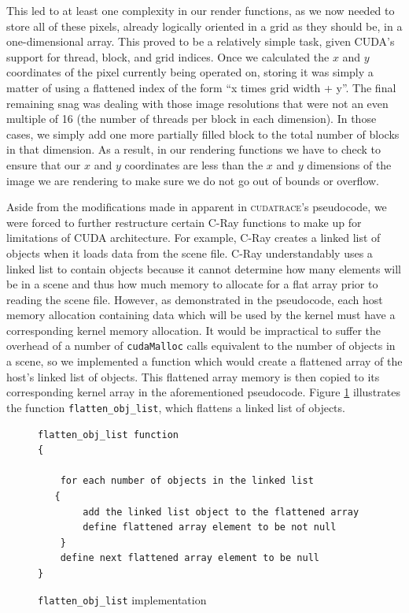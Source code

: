 \documentclass[12pt]{article}
\begin{document}
This led to at least one complexity in our render functions, as we now needed to store all of these pixels, already logically oriented in a grid as they should be, in a one-dimensional array. This proved to be a relatively simple task, given CUDA’s support for thread, block, and grid indices. Once we calculated the $x$ and $y$ coordinates of the pixel currently being operated on, storing it was simply a matter of using a flattened index of the form “x times grid width + y”. The final remaining snag was dealing with those image resolutions that were not an even multiple of 16 (the number of threads per block in each dimension). In those cases, we simply add one more partially filled block to the total number of blocks in that dimension. As a result, in our rendering functions we have to check to ensure that our $x$ and $y$ coordinates are less than the $x$ and $y$ dimensions of the image we are rendering to make sure we do not go out of bounds or overflow. 

Aside from the modifications made in apparent in \textsc{cudatrace}’s pseudocode, we were forced to further restructure certain C-Ray functions to make up for limitations of CUDA architecture. For example, C-Ray creates a linked list of objects when it loads data from the scene file. C-Ray understandably uses a linked list to contain objects because it cannot determine how many elements will be in a scene and thus how much memory to allocate for a flat array prior to reading the scene file. However, as demonstrated in the pseudocode, each host memory allocation containing data which will be used by the kernel must have a corresponding kernel memory allocation. It would be impractical to suffer the overhead of a number of \texttt{cudaMalloc} calls equivalent to the number of objects in a scene, so we implemented a function which would create a flattened array of the host’s linked list of objects. This flattened array memory is then copied to its corresponding kernel array in the aforementioned pseudocode. Figure \ref{code:flatten_obj_list} illustrates the function \texttt{flatten\_obj\_list}, which flattens a linked list of objects.

\begin{figure}
    \caption{\texttt{flatten\_obj\_list} implementation} \label{code:flatten_obj_list}
\begin{lstlisting}
flatten_obj_list function
{
   
    for each number of objects in the linked list 
   {
        add the linked list object to the flattened array
        define flattened array element to be not null
    }
    define next flattened array element to be null 
}
\end{lstlisting}
\end{figure}
\end{document}
